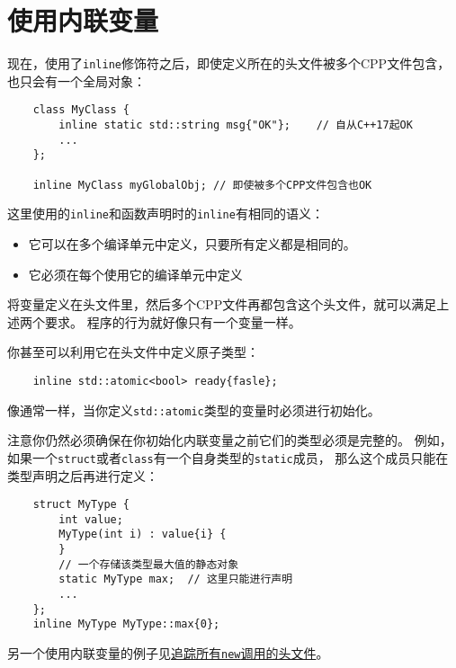 \section{使用内联变量}
现在，使用了\texttt{inline}修饰符之后，即使定义所在的头文件被多个CPP文件包含，
也只会有一个全局对象：
\begin{lstlisting}
    class MyClass {
        inline static std::string msg{"OK"};    // 自从C++17起OK
        ...
    };

    inline MyClass myGlobalObj; // 即使被多个CPP文件包含也OK
\end{lstlisting}
这里使用的\texttt{inline}和函数声明时的\texttt{inline}有相同的语义：
\begin{itemize}
    \item 它可以在多个编译单元中定义，只要所有定义都是相同的。
    \item 它必须在每个使用它的编译单元中定义
\end{itemize}
将变量定义在头文件里，然后多个CPP文件再都包含这个头文件，就可以满足上述两个要求。
程序的行为就好像只有一个变量一样。

你甚至可以利用它在头文件中定义原子类型：
\begin{lstlisting}
    inline std::atomic<bool> ready{fasle};
\end{lstlisting}
像通常一样，当你定义\texttt{std::atomic}类型的变量时必须进行初始化。

注意你仍然必须确保在你初始化内联变量之前它们的类型必须是完整的。
例如，如果一个\texttt{struct}或者\texttt{class}有一个自身类型的\texttt{static}成员，
那么这个成员只能在类型声明之后再进行定义：
\begin{lstlisting}
    struct MyType {
        int value;
        MyType(int i) : value{i} {
        }
        // 一个存储该类型最大值的静态对象
        static MyType max;  // 这里只能进行声明
        ...
    };
    inline MyType MyType::max{0};
\end{lstlisting}
另一个使用内联变量的例子见\hyperref[ch30.4]{追踪所有\texttt{new}调用的头文件}。

